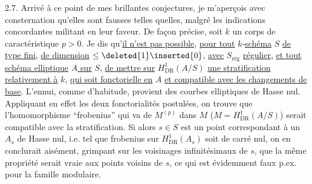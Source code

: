 2.7. Arrivé à ce point de mes brillantes conjectures, je m'aperçois avec consternation qu'elles sont fausses telles quelles, malgré les indications concordantes militant en leur faveur. De façon précise, soit $k$ un corps de caractéristique  $p>0$. Je dis qu'\uline{il n'est pas possible}, \uline{pour tout} $k$-\uline{schéma} $S$ \uline{de type fini}, \uline{de dimension} $\le\deleted{1}\inserted{0}$, \uline{avec} $S_{\text{rég}}$ \uline{régulier}, \uline{et tout schéma elliptique} \uline{$A$ sur} $S$, \uline{de mettre sur} $H^1_{\operatorname{DR}}(A/S)$ \uline{une stratification relativement à} $k$, \uline{qui soit fonctorielle en} $A$ \uline{et compatible avec les changements de base}. L'ennui, comme d'habitude, provient des courbes elliptiques de Hasse nul. Appliquant en effet les deux fonctorialités postulées, on trouve que l'homomorphisme ``frobenius'' qui va de $M^{(p)}$ dans $M$ ($M=H^1_{\operatorname{DR}}(A/S)$) serait compatible avec la stratification. Si alors $s\in S$ est un point correspondant à un $A_s$ de Hasse nul, i.e. tel que frobenius sur $H^1_{\operatorname{DR}}(A_s)$ soit de carré nul, on en conclurait aisément, grimpant sur les voisinages infinitésimaux de $s$, que la même propriété serait vraie aux points voisins de $s$, ce qui est évidemment faux p.ex. pour la famille modulaire.
